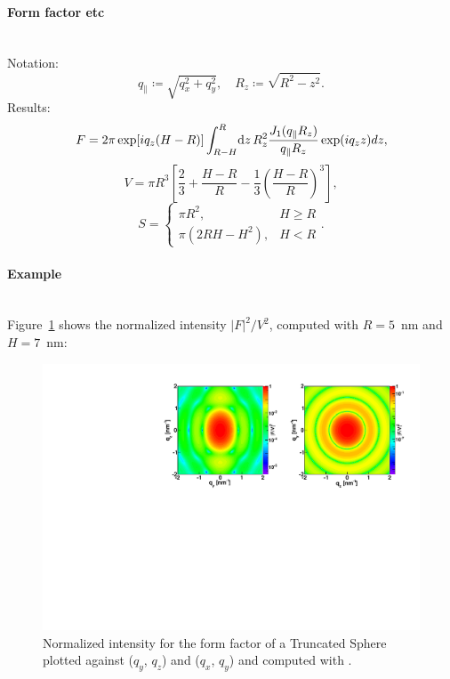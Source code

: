 \paragraph{Form factor etc}\strut\\
Notation:
\begin{equation*}
  q_{\parallel} \coloneqq \sqrt{q_x^2+q_y^2},\quad
  R_z \coloneqq \sqrt{R^2-z^2}.
\end{equation*}
Results:
\begin{equation*}  
F= 2\pi \exp[i q_z (H-R)]\int_{R-H}^{R}\!\text{d} z\, R_z^2
       \frac{J_1(q_{\parallel} R_z) }{q_{\parallel} R_z} \exp(i q_z z) dz,
\end{equation*}
\begin{equation*}
  V=\pi R^3 \left[\dfrac{2}{3} + \dfrac{H-R}{R} - \dfrac{1}{3}\left(\dfrac{H-R}{R}\right)^3\right],
\end{equation*}
\begin{equation*}
  S = \left\{\begin{array}{ll} \pi R^2, & H \geq R \\
         \pi\left(2RH-H^2\right), & H < R \end{array}\right..
\end{equation*}

\paragraph{Example}\strut\\
Figure~\ref{fig:SphereEx} shows the normalized intensity $|F|^2/V^2$, computed with $R=5$~nm and $H=7$~nm:
\begin{figure}[h]
\begin{center}
\includegraphics[angle=-90,width=\textwidth]{fig/ff/figffsphere.pdf}
\end{center}
\caption{Normalized intensity for the form factor of a Truncated Sphere plotted against ($q_y$, $q_z$) and ($q_x$, $q_y$) and
  computed with .}
\label{fig:SphereEx}
\end{figure}

